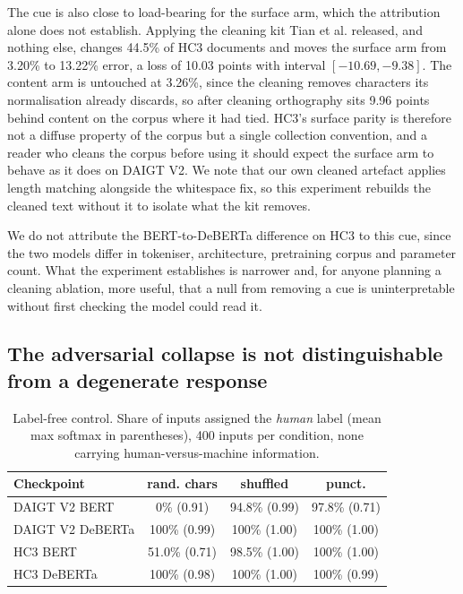 The cue is also close to load-bearing for the surface arm, which the attribution alone does not establish. Applying the cleaning kit Tian et al. released, and nothing else, changes 44.5\% of HC3 documents and moves the surface arm from 3.20\% to 13.22\% error, a loss of 10.03 points with interval $[-10.69, -9.38]$. The content arm is untouched at 3.26\%, since the cleaning removes characters its normalisation already discards, so after cleaning orthography sits 9.96 points behind content on the corpus where it had tied. HC3's surface parity is therefore not a diffuse property of the corpus but a single collection convention, and a reader who cleans the corpus before using it should expect the surface arm to behave as it does on DAIGT V2. We note that our own cleaned artefact applies length matching alongside the whitespace fix, so this experiment rebuilds the cleaned text without it to isolate what the kit removes.

We do not attribute the BERT-to-DeBERTa difference on HC3 to this cue, since the two models differ in tokeniser, architecture, pretraining corpus and parameter count. What the experiment establishes is narrower and, for anyone planning a cleaning ablation, more useful, that a null from removing a cue is uninterpretable without first checking the model could read it.

\subsection{The adversarial collapse is not distinguishable from a degenerate response}
\label{sec:labelfree}

\begin{table}[!ht]
\centering
\caption{Label-free control. Share of inputs assigned the \emph{human} label (mean max softmax in parentheses), 400 inputs per condition, none carrying human-versus-machine information.}
\label{tab:labelfree}
\footnotesize
\setlength{\tabcolsep}{3.5pt}
\begin{tabular}{@{}lccc@{}}
\toprule
Checkpoint & rand. chars & shuffled & punct. \\
\midrule
DAIGT V2 BERT & 0\% (0.91) & 94.8\% (0.99) & 97.8\% (0.71) \\
DAIGT V2 DeBERTa & 100\% (0.99) & 100\% (1.00) & 100\% (1.00) \\
HC3 BERT & 51.0\% (0.71) & 98.5\% (1.00) & 100\% (1.00) \\
HC3 DeBERTa & 100\% (0.98) & 100\% (1.00) & 100\% (0.99) \\
\bottomrule
\end{tabular}
\end{table}

